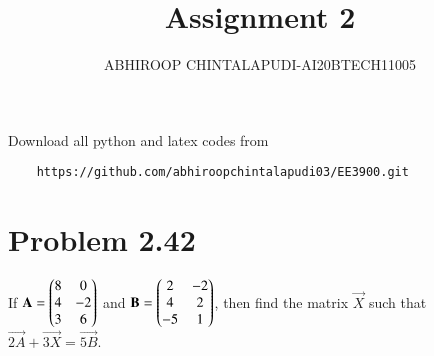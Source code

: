 \documentclass[journal,12pt,twocolumn]{IEEEtran}
\begin{document}
	\def\putbox#1#2#3{\makebox[0in][l]{\makebox[#1][l]{}\raisebox{\baselineskip}[0in][0in]{\raisebox{#2}[0in][0in]{#3}}}}
	\def\rightbox#1{\makebox[0in][r]{#1}}
	\def\centbox#1{\makebox[0in]{#1}}
	\def\topbox#1{\raisebox{-\baselineskip}[0in][0in]{#1}}
	\def\midbox#1{\raisebox{-0.5\baselineskip}[0in][0in]{#1}}
	\vspace{3cm}
	\title{Assignment 2}
	\author{ABHIROOP CHINTALAPUDI-AI20BTECH11005}
	\maketitle
	\newpage
	\bigskip
	\renewcommand{\thefigure}{\theenumi}
	\renewcommand{\thetable}{\theenumi}
Download all python and latex codes from 
\begin{lstlisting}
	https://github.com/abhiroopchintalapudi03/EE3900.git
\end{lstlisting}

	\section{Problem 2.42}
If
$\mathbf{A}=\begin{pmatrix}8 & 0 \\ 4 & -2 \\ 3 & 6\end{pmatrix}$ and $\mathbf{B}=\begin{pmatrix}2 & -2 \\ 4 & 2 \\ -5 & 1\end{pmatrix}$, then find the matrix $\vec{X}$ such that $\vec{2A}+\vec{3X}=\vec{5B}$.
\end{document}
